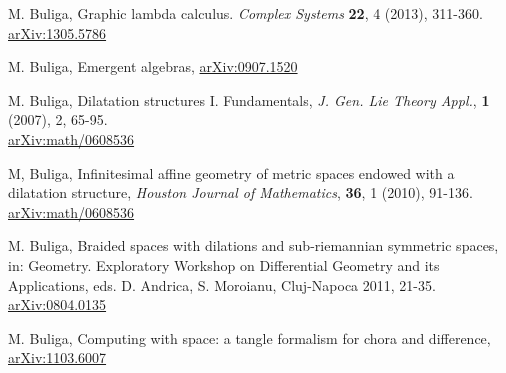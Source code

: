 \documentclass{article}
\begin{document}






 
















%


\begin{thebibliography}{99}


 M. Buliga, Graphic lambda calculus. {\it Complex Systems} {\bf 22}, 4 (2013), 311-360. \\ 
\href{https://arxiv.org/abs/1305.5786}{arXiv:1305.5786}

 M. Buliga, Emergent algebras, \href{https://arxiv.org/abs/0907.1520}{arXiv:0907.1520}

 M. Buliga, Dilatation structures I. Fundamentals, {\it 
J. Gen. Lie Theory Appl.},  {\bf 1} (2007),  2, 65-95. \\ 
\href{https://arxiv.org/abs/math/0608536}{arXiv:math/0608536}


 M, Buliga, Infinitesimal affine geometry of metric spaces endowed with a dilatation structure, {\it Houston Journal of Mathematics}, {\bf 36}, 1 (2010), 91-136. \\ 
\href{https://arxiv.org/abs/0804.0135}{arXiv:math/0608536}


 M. Buliga, Braided spaces with dilations and sub-riemannian symmetric spaces, in: Geometry. Exploratory Workshop on Differential Geometry and its Applications, eds. D. Andrica, S. Moroianu, Cluj-Napoca 2011, 21-35. \\   
\href{https://arxiv.org/abs/1005.5031}{arXiv:0804.0135}


 M. Buliga, Computing with space: a tangle formalism for chora and difference, \href{https://arxiv.org/abs/1103.6007}{arXiv:1103.6007}






\end{thebibliography}
\end{document}
